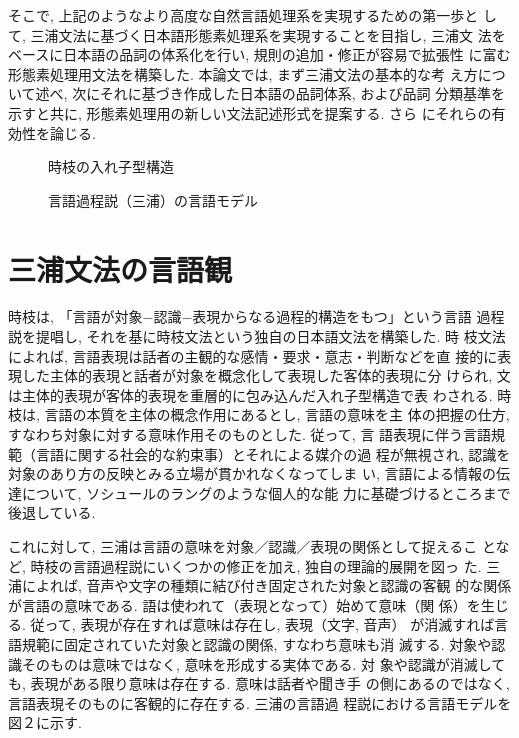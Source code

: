  そこで, 上記のようなより高度な自然言語処理系を実現するための第一歩と
して, 三浦文法に基づく日本語形態素処理系を実現することを目指し, 三浦文
法をベースに日本語の品詞の体系化を行い, 規則の追加・修正が容易で拡張性
に富む形態素処理用文法を構築した. 本論文では, まず三浦文法の基本的な考
え方について述べ, 次にそれに基づき作成した日本語の品詞体系, および品詞
分類基準を示すと共に, 形態素処理用の新しい文法記述形式を提案する. さら
にそれらの有効性を論じる.

\begin{figure}
\begin{center}
	
	
	
\end{center}
\vspace*{-0.2mm}
\caption{時枝の入れ子型構造}
\label{fig:tokieda}
\end{figure}
\begin{figure}
\vspace*{-0.2mm}
\begin{center}
	
	
	
\end{center}
\vspace*{-0.2mm}
\caption{言語過程説（三浦）の言語モデル}
\label{fig:miura}
\end{figure}
\section{三浦文法の言語観}

時枝は, 「言語が対象−認識−表現からなる過程的構造をもつ」という言語
過程説を提唱し, それを基に時枝文法という独自の日本語文法を構築した. 時
枝文法によれば, 言語表現は話者の主観的な感情・要求・意志・判断などを直
接的に表現した主体的表現と話者が対象を概念化して表現した客体的表現に分
けられ, 文は主体的表現が客体的表現を重層的に包み込んだ入れ子型構造で表
わされる. 時枝は, 言語の本質を主体の概念作用にあるとし, 言語の意味を主
体の把握の仕方, すなわち対象に対する意味作用そのものとした. 従って, 言
語表現に伴う言語規範（言語に関する社会的な約束事）とそれによる媒介の過
程が無視され, 認識を対象のあり方の反映とみる立場が貫かれなくなってしま
い, 言語による情報の伝達について, ソシュールのラングのような個人的な能
力に基礎づけるところまで後退している.

 これに対して, 三浦は言語の意味を対象／認識／表現の関係として捉えるこ
となど, 時枝の言語過程説にいくつかの修正を加え, 独自の理論的展開を図っ
た. 三浦によれば, 音声や文字の種類に結び付き固定された対象と認識の客観
的な関係が言語の意味である. 語は使われて（表現となって）始めて意味（関
係）を生じる. 従って, 表現が存在すれば意味は存在し, 表現（文字, 音声）
が消滅すれば言語規範に固定されていた対象と認識の関係, すなわち意味も消
滅する. 対象や認識そのものは意味ではなく, 意味を形成する実体である. 対
象や認識が消滅しても, 表現がある限り意味は存在する. 意味は話者や聞き手
の側にあるのではなく, 言語表現そのものに客観的に存在する. 三浦の言語過
程説における言語モデルを図２に示す. 

